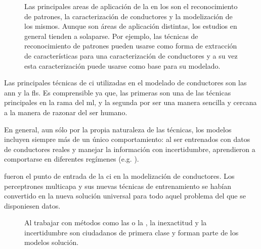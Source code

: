 \begin{figure}
	\centering
	\caption{Las principales areas de aplicación de la  en los  son el reconocimiento de patrones, la caracterización de conductores y la modelización de los mismos. Aunque son áreas de aplicación distintas, los estudios en general tienden a solaparse. Por ejemplo, las técnicas de reconocimiento de patrones pueden usarse como forma de extracción de características para una caracterización de conductores y a su vez esta caracterización puede usarse como base para su modelado.}
	\label{fig:main-applications-of-ci-in-its}
\end{figure}

Las principales técnicas de \gls{ci} utilizadas en el modelado de conductores son las \gls{ann} y la \glspl{fl}. Es comprensible ya que, las primeras son una de las técnicas principales en la rama del \gls{ml}, y la segunda por ser una manera sencilla y cercana a la manera de razonar del ser humano.

En general, aun sólo por la propia naturaleza de las técnicas, los modelos incluyen siempre más de un único comportamiento: al ser entrenados con datos de conductores reales y manejar la información con incertidumbre, aprendieron a comportarse en diferentes regímenes (e.g. \textit{}).

 fueron el punto de entrada de la \gls{ci} en la modelización de conductores. Los perceptrones multicapa y sus nuevas técnicas de entrenamiento se habían convertido en la nueva solución universal para todo aquel problema del que se disponiesen datos.

\begin{figure}
	\caption{Al trabajar con métodos como las  o la , la inexactitud y la incertidumbre son ciudadanos de primera clase y forman parte de los modelos solución.}
	\label{fig:ann-and-fl-work-with-uncertainty}
\end{figure}

